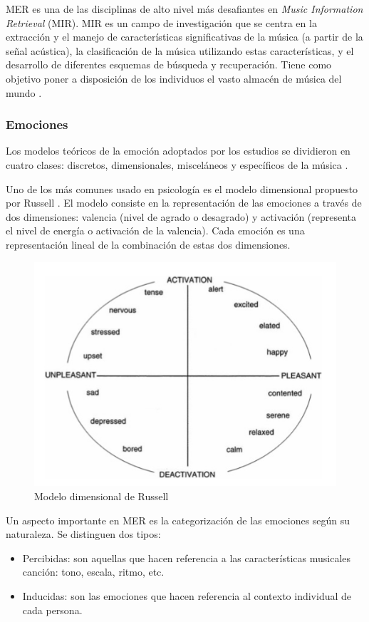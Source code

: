 \documentclass[12pt,a4paper]{article}
\begin{document}
MER es una de las disciplinas de alto nivel más desafiantes en \textit{Music Information Retrieval} (MIR). MIR es un campo de investigación que se centra en la extracción y el manejo de características significativas de la música (a partir de la señal acústica), la clasificación de la música utilizando estas características, y el desarrollo de diferentes esquemas de búsqueda y recuperación. Tiene como objetivo poner a disposición de los individuos el vasto almacén de música del mundo \cite{schedl2014music}.

\subsubsection{Emociones}\label{emo}

Los modelos teóricos de la emoción adoptados por los estudios se dividieron en cuatro clases: discretos, dimensionales, misceláneos y específicos de la música \cite{eerola2012review}. 


Uno de los más comunes usado en psicología es el modelo dimensional propuesto por Russell \cite{posner2005circumplex}. El modelo consiste en la representación de las emociones a través de dos dimensiones: valencia (nivel de agrado o desagrado) y activación (representa el nivel de energía o activación de la valencia). Cada emoción es una representación lineal de la combinación de estas dos dimensiones.

\begin{figure}[H]
	\centering
	\includegraphics[width=0.7\linewidth]{figs/russell}
	\caption{Modelo dimensional de Russell \cite{posner2005circumplex}}
	\label{fig:russell}
\end{figure}


Un aspecto importante en MER es la categorización de las emociones según su naturaleza. Se distinguen dos tipos:
\begin{itemize}
\item Percibidas: son aquellas que hacen referencia a las características musicales canción: tono, escala, ritmo, etc.
\item Inducidas: son las emociones que hacen referencia al contexto individual de cada persona.
\end{itemize}
\end{document}
